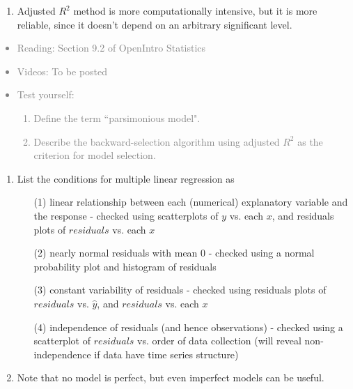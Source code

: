 \documentclass[11pt]{article}
\newcommand{\gray}[1]{\textcolor{gray}{#1}}
\begin{document}
\begin{enumerate}[resume]
\item Adjusted $R^2$ method is more computationally intensive, but it is more reliable, since it doesn't depend on an arbitrary significant level.

\end{enumerate}

\gray{
{\it
\vspace{-0.55cm}
\begin{itemize}
\renewcommand{\labelitemi}{{\textcolor{dark}{$\ast$}}}
\item Reading: Section 9.2 of OpenIntro Statistics
\item Videos: To be posted
\item Test yourself:
\begin{enumerate}
\item Define the term ``parsimonious model".
\item Describe the backward-selection algorithm using adjusted $R^2$ as the criterion for model selection.
\end{enumerate}
\end{itemize}
}}

%

\vspace{0.48cm}

%
\begin{enumerate}[resume]
\renewcommand\labelenumi{\textcolor{light}{\textbf{LO \theenumi.}}}

\item List the conditions for multiple linear regression as
\begin{enumerate}
\item[(1)] linear relationship between each (numerical) explanatory variable and the response - checked using scatterplots of $y$ vs. each $x$, and residuals plots of $residuals$ vs. each $x$
\item[(2)] nearly normal residuals with mean 0 - checked using a normal probability plot and histogram of residuals
\item[(3)] constant variability of residuals - checked using residuals plots of $residuals$ vs. $\hat{y}$, and $residuals$ vs. each $x$
\item[(4)] independence of residuals (and hence observations) - checked using a scatterplot of $residuals$ vs. order of data collection (will reveal non-independence if data have time series structure)
\end{enumerate}

\item Note that no model is perfect, but even imperfect models can be useful.

\end{enumerate}
\end{document}
